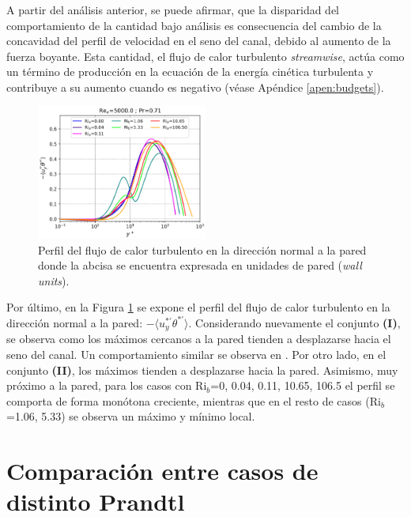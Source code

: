 A partir del análisis anterior, se puede afirmar, que la disparidad del comportamiento  de la cantidad bajo análisis es consecuencia del cambio de la concavidad del perfil de velocidad en el seno del canal, debido al aumento de la fuerza boyante. Esta cantidad, el flujo de calor turbulento \textit{streamwise}, actúa como un término de producción en la ecuación de la energía cinética turbulenta y contribuye a su aumento cuando es negativo (véase Apéndice \ref{apen:budgets}).


\begin{figure}[H] %
  \centering
  \includegraphics[width=0.5\textwidth]{figures/cap5/Re5000-Pr071/uyphif_profile.png}  
  \caption{Perfil del flujo de calor turbulento en la dirección normal a la pared donde la abcisa se encuentra expresada en unidades de pared (\textit{wall units}).}
  \label{fig:uyphi_f-Re5000-Pr071}
\end{figure}

Por último, en la Figura \ref{fig:uyphi_f-Re5000-Pr071} se expone el perfil del flujo de calor turbulento en la dirección normal a la pared: $-\langle u_y^{\ast \prime } \theta^{\ast \prime } \rangle$. Considerando nuevamente el conjunto \textbf{(I)}, se observa como los máximos cercanos a la pared tienden a desplazarse hacia el seno del canal. Un comportamiento similar se observa en \cite{you2003direct}. Por otro lado, en el conjunto \textbf{(II)}, los máximos tienden a desplazarse hacia la pared. Asimismo, muy próximo a la pared, para los casos con Ri$_b$=0, 0.04, 0.11, 10.65, 106.5 el perfil se comporta de forma monótona creciente, mientras que en el resto de casos (Ri$_b$=1.06, 5.33) se observa un máximo y mínimo local. 

\section{Comparación entre casos de distinto Prandtl}

